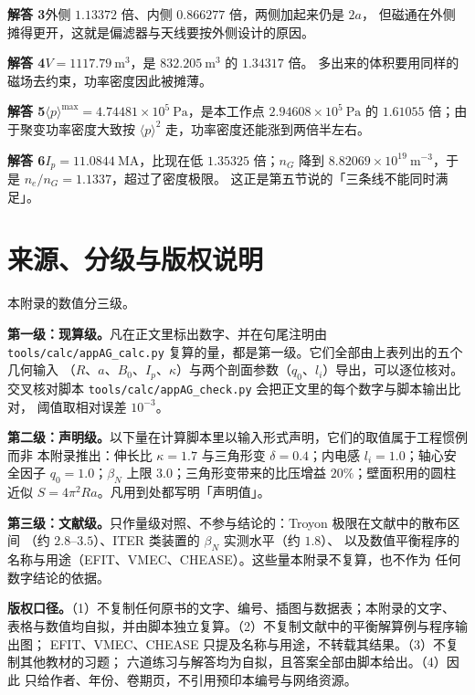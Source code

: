 \textbf{解答 3}外侧 $1.13372$ 倍、内侧 $0.866277$ 倍，两侧加起来仍是 $2a$，
但磁通在外侧摊得更开，这就是偏滤器与天线要按外侧设计的原因。

\textbf{解答 4}$V=1117.79\ \mathrm{m^3}$，是 $832.205\ \mathrm{m^3}$ 的 $1.34317$ 倍。
多出来的体积要用同样的磁场去约束，功率密度因此被摊薄。

\textbf{解答 5}$\langle p\rangle^{\max}=4.74481\times10^{5}\ \mathrm{Pa}$，是本工作点
$2.94608\times10^{5}\ \mathrm{Pa}$ 的 $1.61055$ 倍；由于聚变功率密度大致按
$\langle p\rangle^2$ 走，功率密度还能涨到两倍半左右。

\textbf{解答 6}$I_p=11.0844\ \mathrm{MA}$，比现在低 $1.35325$ 倍；$n_G$ 降到
$8.82069\times10^{19}\ \mathrm{m^{-3}}$，于是 $n_e/n_G=1.1337$，超过了密度极限。
这正是第五节说的「三条线不能同时满足」。

\section{来源、分级与版权说明}
\label{sec:app-ag-source}

\begingroup\small
本附录的数值分三级。

\textbf{第一级：现算级。}凡在正文里标出数字、并在句尾注明由
\texttt{tools/\allowbreak{}calc/\allowbreak{}appAG\_calc.py} 复算的量，都是第一级。它们全部由上表列出的五个几何输入
（$R$、$a$、$B_0$、$I_p$、$\kappa$）与两个剖面参数（$q_0$、$l_i$）导出，可以逐位核对。
交叉核对脚本 \texttt{tools/\allowbreak{}calc/\allowbreak{}appAG\_check.py} 会把正文里的每个数字与脚本输出比对，
阈值取相对误差 $10^{-3}$。

\textbf{第二级：声明级。}以下量在计算脚本里以输入形式声明，它们的取值属于工程惯例而非
本附录推出：伸长比 $\kappa=1.7$ 与三角形变 $\delta=0.4$；内电感 $l_i=1.0$；轴心安全因子
$q_0=1.0$；$\beta_N$ 上限 $3.0$；三角形变带来的比压增益 $20\%$；壁面积用的圆柱近似
$S=4\pi^2Ra$。凡用到处都写明「声明值」。

\textbf{第三级：文献级。}只作量级对照、不参与结论的：Troyon 极限在文献中的散布区间
（约 $2.8$--$3.5$）、ITER 类装置的 $\beta_N$ 实测水平（约 $1.8$）、
以及数值平衡程序的名称与用途（EFIT、VMEC、CHEASE）。这些量本附录不复算，也不作为
任何数字结论的依据。

\textbf{版权口径。}（1）不复制任何原书的文字、编号、插图与数据表；本附录的文字、
表格与数值均自拟，并由脚本独立复算。（2）不复制文献中的平衡解算例与程序输出图；
EFIT、VMEC、CHEASE 只提及名称与用途，不转载其结果。（3）不复制其他教材的习题；
六道练习与解答均为自拟，且答案全部由脚本给出。（4）因此
只给作者、年份、卷期页，不引用预印本编号与网络资源。

